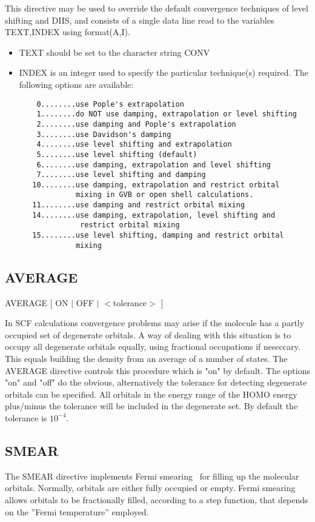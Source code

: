\documentclass[11pt,fleqn]{article}
\begin{document}
This directive may be used to override the default convergence techniques
of level shifting and DIIS, and consists of a single data line
read to the variables TEXT,INDEX using format(A,I).
\begin{itemize}
\item TEXT should be set to the character string CONV
\item INDEX is an integer  used to specify the particular technique(s)
required. The following options are available:

{
\footnotesize
\begin{verbatim}
    0........use Pople's extrapolation
    1........do NOT use damping, extrapolation or level shifting
    2........use damping and Pople's extrapolation
    3........use Davidson's damping
    4........use level shifting and extrapolation
    5........use level shifting (default)
    6........use damping, extrapolation and level shifting
    7........use level shifting and damping
   10........use damping, extrapolation and restrict orbital
             mixing in GVB or open shell calculations.
   11........use damping and restrict orbital mixing
   14........use damping, extrapolation, level shifting and
              restrict orbital mixing
   15........use level shifting, damping and restrict orbital
             mixing
\end{verbatim}
}
\end{itemize}

\subsection[AVERAGE]{AVERAGE}

    AVERAGE [ ON $|$ OFF $|$ $<$tolerance$>$ ]

In SCF calculations convergence problems may arise if the molecule has a 
partly occupied set of degenerate orbitals. A way of dealing with this situation
is to occupy all degenerate orbitals equally, using fractional occupations if
neseccary. This equals building the density from an average of a number of 
states. The AVERAGE directive controls this procedure which is "on" by default.
The options "on" and "off" do the obvious, alternatively the tolerance for 
detecting degenerate orbitals can be specified. All orbitals in the energy
range of the HOMO energy plus/minus the tolerance will be included in the 
degenerate set. By default the tolerance is $10^{-4}$.


\subsection[SMEAR]{SMEAR}
The SMEAR directive implements Fermi smearing~\cite{warren} for filling
up the molecular orbitals. Normally, orbitals are either fully occupied or
empty. Fermi smearing allows orbitals to be fractionally filled,
according to a step function, that depends on the ''Fermi
temperature'' employed.
\end{document}
